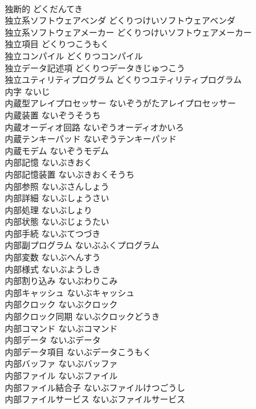 \documentclass[8pt]{extreport}
\begin{document}
\begin{CJK}{UTF8}{min}
\\	独断的	どくだんてき	
\\	独立系ソフトウェアベンダ	どくりつけいソフトウェアベンダ	
\\	独立系ソフトウェアメーカー	どくりつけいソフトウェアメーカー	
\\	独立項目	どくりつこうもく	
\\	独立コンパイル	どくりつコンパイル	
\\	独立データ記述項	どくりつデータきじゅつこう	
\\	独立ユティリティプログラム	どくりつユティリティプログラム	
\\	内字	ないじ	
\\	内蔵型アレイプロセッサー	ないぞうがたアレイプロセッサー	
\\	内蔵装置	ないぞうそうち	
\\	内蔵オーディオ回路	ないぞうオーディオかいろ	
\\	内蔵テンキーパッド	ないぞうテンキーパッド	
\\	内蔵モデム	ないぞうモデム	
\\	内部記憶	ないぶきおく	
\\	内部記憶装置	ないぶきおくそうち	
\\	内部参照	ないぶさんしょう	
\\	内部詳細	ないぶしょうさい	
\\	内部処理	ないぶしょり	
\\	内部状態	ないぶじょうたい	
\\	内部手続	ないぶてつづき	
\\	内部副プログラム	ないぶふくプログラム	
\\	内部変数	ないぶへんすう	
\\	内部様式	ないぶようしき	
\\	内部割り込み	ないぶわりこみ	
\\	内部キャッシュ	ないぶキャッシュ	
\\	内部クロック	ないぶクロック	
\\	内部クロック同期	ないぶクロックどうき	
\\	内部コマンド	ないぶコマンド	
\\	内部データ	ないぶデータ	
\\	内部データ項目	ないぶデータこうもく	
\\	内部バッファ	ないぶバッファ	
\\	内部ファイル	ないぶファイル	
\\	内部ファイル結合子	ないぶファイルけつごうし	
\\	内部ファイルサービス	ないぶファイルサービス	

\end{CJK}
\end{document}
